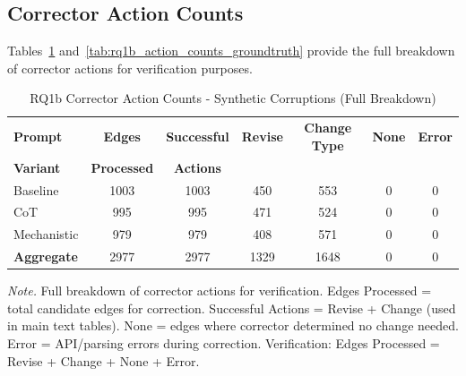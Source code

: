 \documentclass[class=Thesis]{standalone}
\begin{document}
\subsection{Corrector Action Counts}
\label{app:corrector_action_counts}

Tables~\ref{tab:rq1b_action_counts_synthetic} and~\ref{tab:rq1b_action_counts_groundtruth} provide the full breakdown of corrector actions for verification purposes.

\begin{table}[H]
\centering
\caption{RQ1b Corrector Action Counts - Synthetic Corruptions (Full Breakdown)}
\label{tab:rq1b_action_counts_synthetic}
\begin{threeparttable}
\begin{tabular}{lcccccc}
\toprule
\textbf{Prompt} & \textbf{Edges} & \textbf{Successful} & \textbf{Revise} & \textbf{Change Type} & \textbf{None} & \textbf{Error} \\
\textbf{Variant} & \textbf{Processed} & \textbf{Actions} & & & & \\
\midrule
Baseline & 1003 & 1003 & 450 & 553 & 0 & 0 \\
CoT & 995 & 995 & 471 & 524 & 0 & 0 \\
Mechanistic & 979 & 979 & 408 & 571 & 0 & 0 \\
\midrule
\textbf{Aggregate} & 2977 & 2977 & 1329 & 1648 & 0 & 0 \\
\bottomrule
\end{tabular}
\begin{tablenotes}
\small
\item \textit{Note.} Full breakdown of corrector actions for verification. 
Edges Processed = total candidate edges for correction.
Successful Actions = Revise + Change (used in main text tables).
None = edges where corrector determined no change needed.
Error = API/parsing errors during correction.
Verification: Edges Processed = Revise + Change + None + Error.
\end{tablenotes}
\end{threeparttable}
\end{table}
\end{document}
